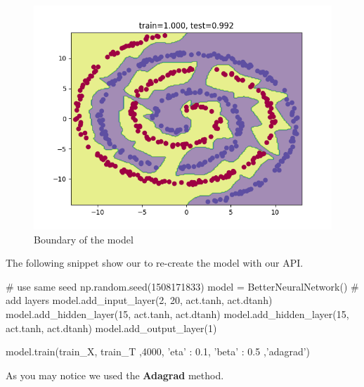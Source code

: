 \documentclass[11pt]{article}
\begin{document}
\begin{figure}[H]
\label{fig: results_boundary}
\centering
\includegraphics[scale=0.6]{images/competition/competition_1508171833.png}	
\caption{Boundary of the model}
\end{figure}

The following snippet show our to re-create the model with our API.
\begin{python}
	# use same seed
	np.random.seed(1508171833)
    model = BetterNeuralNetwork()
    # add layers
    model.add_input_layer(2, 20, act.tanh, act.dtanh)
    model.add_hidden_layer(15, act.tanh, act.dtanh)
    model.add_hidden_layer(15, act.tanh, act.dtanh)
    model.add_output_layer(1)

    model.train(train_X, train_T ,4000, { 'eta' : 0.1, 'beta' : 0.5 },'adagrad')
\end{python}

As you may notice we used the \textbf{Adagrad} method.
\printbibliography
\end{document}
